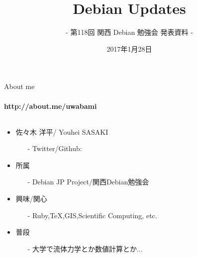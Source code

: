 \documentclass[cjk,dvipdfmx,14pt,compress,fragile]{beamer}
\title{Debian Updates}
\subtitle{- 第118回 関西 Debian 勉強会 発表資料 -}
\author[佐々木洋平]{}
\institute[関西Debian勉強会]{}
\date[2017/01/28]{2017年1月28日\\\textfootnotesize{於: 関西 Debian 勉強会 + openSUSE Meetup + LILO \& 東海道らぐLT大会}}
\begin{document}
\begin{frame}
  \maketitle
\end{frame}


\begin{frame}{About me}
  \framesubtitle{http://about.me/uwabami}
  \begin{columns}[c]
    \begin{column}{.74\linewidth}
      \begin{itemize}
      \item 佐々木 洋平/ Youhei SASAKI
        \begin{itemize}
        \item[-] Twitter/Github: \href{http://twitter.com/uwabami/}{\color{blue}{@uwabami}}
        \end{itemize}
      \item 所属
        \begin{itemize}
        \item[-] Debian JP Project/関西Debian勉強会
        \end{itemize}
      \item 興味/関心
        \begin{itemize}
        \item[-] Ruby,TeX,GIS,Scientific Computing, etc.
        \end{itemize}
      \item 普段
        \begin{itemize}
        \item[-] 大学で流体力学とか数値計算とか...
        \end{itemize}
      \end{itemize}
    \end{column}
    \begin{column}{.25\linewidth}

\end{column}
\end{columns}
\end{frame}
\end{document}
